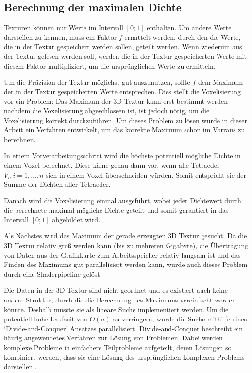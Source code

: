 \documentclass[a4paper,fontsize=12pt,toc=bib,halfparskip,ngerman]{scrartcl}
\begin{document}
\subsection{Berechnung der maximalen Dichte}
Texturen k\"onnen nur Werte im Intervall $[0;1]$ enthalten. Um andere Werte darstellen zu k\"onnen, muss ein Faktor $f$ ermittelt werden, durch den die Werte, die in der Textur gespeichert werden sollen, geteilt werden. Wenn wiederum aus der Textur gelesen werden soll, werden die in der Textur gespeicherten Werte mit diesem Faktor multipliziert, um die urspr\"unglichen Werte zu ermitteln.

Um die Pr\"azision der Textur m\"oglichst gut auszunutzen, sollte $f$ dem Maximum der in der Textur gespeicherten Werte entsprechen. Dies stellt die Voxelisierung vor ein Problem: Das Maximum der 3D Textur kann erst bestimmt werden nachdem die Voxelisierung abgeschlossen ist, ist jedoch n\"otig, um die Voxelisierung korrekt durchzuf\"uhren. Um dieses Problem zu l\"osen wurde in dieser Arbeit ein Verfahren entwickelt, um das korrekte Maximum schon im Vorraus zu berechnen.

In einem Vorverarbeitungsschritt wird die h\"ochste potentiell m\"ogliche Dichte in einem Voxel berechnet. Diese k\"ame genau dann vor, wenn alle Tetraeder $V_i, i=1,\dots,n$ sich in einem Voxel \"uberschneiden w\"urden. Somit entspricht sie der Summe der Dichten aller Tetraeder. 

Danach wird die Voxelisierung einmal ausgef\"uhrt, wobei jeder Dichtewert durch die berechnete maximal m\"ogliche Dichte geteilt und somit garantiert in das Intervall $[0;1]$ abgebildet wird. 

Als N\"achstes wird das Maximum der gerade erzeugten 3D Textur gesucht. Da die 3D Textur relativ gro{\ss} werden kann (bis zu mehreren Gigabyte), die \"Ubertragung von Daten aus der Grafikkarte zum Arbeitsspeicher relativ langsam ist und das Finden des Maximums gut parallelisiert werden kann, wurde auch dieses Problem durch eine Shaderpipeline gel\"ost. 

Die Daten in der 3D Textur sind nicht geordnet und es existiert auch keine andere Struktur, durch die die Berechnung des Maximums vereinfacht werden k\"onnte. Deshalb musste sie als lineare Suche implementiert werden. Um die potentiell hohe Laufzeit von $O(n)$ zu verringern, wurde die Suche  mithilfe eines `Divide-and-Conquer' Ansatzes parallelisiert. Divide-and-Conquer beschreibt ein h\"aufig angewendetes Verfahren zur L\"osung von Problemen. Dabei werden komplexe Probleme in einfachere Teilprobleme aufgeteilt, deren L\"osungen so kombiniert werden, dass sie eine L\"osung des urspr\"unglichen komplexen Problems darstellen \cite{jordan1994hierarchical}.
\end{document}
